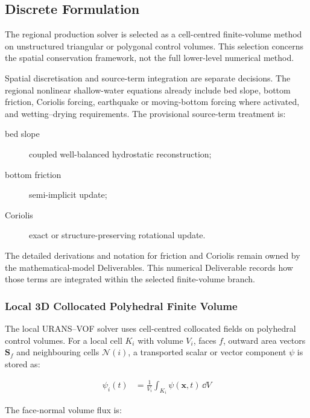 \subsection{Discrete Formulation}
\label{sec:res-num-frm-discrete-formulation}

The regional production solver is selected as a cell-centred
finite-volume method on unstructured triangular or polygonal control
volumes. This selection concerns the spatial conservation framework, not
the full lower-level numerical method.

Spatial discretisation and source-term integration are separate
decisions. The regional nonlinear shallow-water equations already
include bed slope, bottom friction, Coriolis forcing, earthquake or
moving-bottom forcing where activated, and wetting--drying
requirements. The provisional source-term treatment is:

\begin{description}
  \item[bed slope] coupled well-balanced hydrostatic reconstruction;
  \item[bottom friction] semi-implicit update;
  \item[Coriolis] exact or structure-preserving rotational update.
\end{description}

The detailed derivations and notation for friction and Coriolis remain
owned by the mathematical-model Deliverables. This numerical
Deliverable records how those terms are integrated within the selected
finite-volume branch.

\subsubsection{Local 3D Collocated Polyhedral Finite Volume}
\label{sec:res-num-frm-local-polyhedral-finite-volume}

The local URANS--VOF solver uses cell-centred collocated fields on
polyhedral control volumes. For a local cell $K_i$ with volume $V_i$,
faces $f$, outward area vectors $\mathbf{S}_f$ and neighbouring cells
$\mathcal{N}(i)$, a transported scalar or vector component $\psi$ is
stored as:

\begin{align}
  \psi_i(t)
  &=
  \frac{1}{V_i}
  \int_{K_i}
  \psi(\mathbf{x},t)
  \,\dd V
  \label{eq:res-num-frm-local-cell-average}
\end{align}

The face-normal volume flux is:

